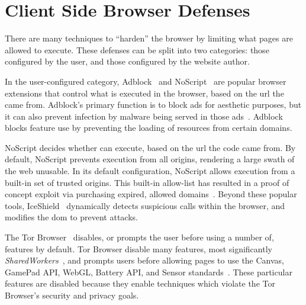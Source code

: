\section{Client Side Browser Defenses}
\label{background:related-browser-defs}

There are many techniques to ``harden'' the browser by limiting what \JS pages
are allowed to execute. These defenses can be split into two categories: those
configured by the user, and those configured by the website author.

In the user-configured category, Adblock~\cite{adblockplus} and
NoScript~\cite{noscriptwebsite} are popular browser
extensions that control what \JS is executed in the browser, based on the
\gls{url} the \JS came from.  Adblock's primary
function is to block ads for aesthetic purposes, but it can also prevent
infection by malware being served in those
ads~\cite{forbes-malware,engadget-malware}.  Adblock blocks feature use by
preventing the loading of resources from certain domains.

NoScript decides whether \JS can execute, based on the \gls{url} the code came
from.  By default, NoScript prevents \JS execution from all origins, rendering
a large swath of the web unusable.  In its default configuration, NoScript
allows \JS execution from a built-in set of trusted origins.  This built-in
allow-list has resulted in a proof of concept exploit via purchasing expired,
allowed domains~\cite{noscript_whitelist}.  Beyond these popular tools,
IceShield~\cite{heiderich2011iceshield} dynamically detects suspicious \JS
calls within the browser, and modifies the \gls{dom} to prevent attacks.

The Tor Browser~\cite{dingledine2004tor} disables, or prompts the user before
using a number of, features by default.  Tor Browser disable many \JS features,
most significantly \textit{SharedWorkers}~\cite{webworkersw3c}, and prompts
users before allowing pages to use the Canvas, GamePad API, WebGL, Battery API,
and Sensor standards~\cite{tor-features}.  These particular features are
disabled because they enable techniques which violate the Tor Browser's
security and privacy goals.

